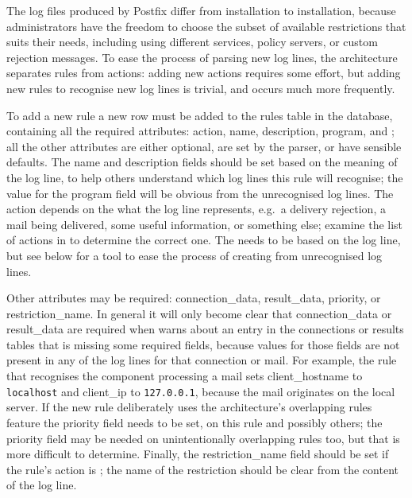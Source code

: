 The log files produced by Postfix differ from installation to installation,
because administrators have the freedom to choose the subset of available
restrictions that suits their needs, including using different
 services, policy servers, or custom rejection messages.  To
ease the process of parsing new log lines, the architecture separates rules
from actions: adding new actions requires some effort, but adding new rules
to recognise new log lines is trivial, and occurs much more frequently.

To add a new rule a new row must be added to the rules table in the
database, containing all the required attributes: action, name,
description, program, and ; all the other attributes are
either optional, are set by the parser, or have sensible defaults.  The
name and description fields should be set based on the meaning of the log
line, to help others understand which log lines this rule will recognise;
the value for the program field will be obvious from the unrecognised log
lines.  The action depends on the what the log line represents, e.g.\ a
delivery rejection, a mail being delivered, some useful information, or
something else; examine the list of actions in  to determine the correct one.  The
 needs to be based on the log line, but see below for a tool
to ease the process of creating \regexes{} from unrecognised log lines.

Other attributes may be required: connection\_data, result\_data, priority,
or restriction\_name.  In general it will only become clear that
connection\_data or result\_data are required when \parsername{} warns
about an entry in the connections or results tables that is missing some
required fields, because values for those fields are not present in any of
the log lines for that connection or mail.  For example, the rule that
recognises the  component processing a mail sets
client\_hostname to \texttt{localhost} and client\_ip to
\texttt{127.0.0.1}, because the mail originates on the local server.  If
the new rule deliberately uses the architecture's overlapping rules feature
the priority field needs to be set, on this rule and possibly others; the
priority field may be needed on unintentionally overlapping rules too, but
that is more difficult to determine.  Finally, the restriction\_name field
should be set if the rule's action is ; the name
of the restriction should be clear from the content of the log line.

